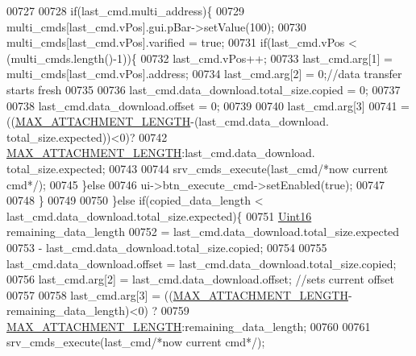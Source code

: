 \begin{DoxyCode}
{{{{{{{{{{{{{{{{{{{{00727                    
00728                    \textcolor{keywordflow}{if}(last\_cmd.multi\_address)\{
00729                         multi\_cmds[last\_cmd.vPos].gui.pBar->setValue(100);
00730                         multi\_cmds[last\_cmd.vPos].varified = \textcolor{keyword}{true};
00731                     \textcolor{keywordflow}{if}(last\_cmd.vPos < (multi\_cmds.length()-1))\{
00732                        last\_cmd.vPos++;
00733                        last\_cmd.arg[1] = multi\_cmds[last\_cmd.vPos].address;
00734                        last\_cmd.arg[2] = 0;\textcolor{comment}{//data transfer starts fresh}
00735                        
00736                        last\_cmd.data\_download.total\_size.copied     = 0;
00737                        
00738                        last\_cmd.data\_download.offset                = 0;
00739                        
00740                        last\_cmd.arg[3]              
00741                                = ((\hyperlink{a00031_aa8abe3a822c64813f7aaba3ca7e3db9c}{MAX\_ATTACHMENT\_LENGTH}-(last\_cmd.data\_download.
      total\_size.expected))<0)?
00742                                    \hyperlink{a00031_aa8abe3a822c64813f7aaba3ca7e3db9c}{MAX\_ATTACHMENT\_LENGTH}:last\_cmd.data\_download.
      total\_size.expected;
00743 
00744                        srv\_cmds\_execute(last\_cmd\textcolor{comment}{/*now current cmd*/});
00745                    \}\textcolor{keywordflow}{else}
00746                        ui->btn\_execute\_cmd->setEnabled(\textcolor{keyword}{true});
00747 
00748                    \}
00749 
00750                \}\textcolor{keywordflow}{else} \textcolor{keywordflow}{if}(copied\_data\_length < last\_cmd.data\_download.total\_size.expected)\{
00751                    \hyperlink{a00001_aae7407b021d43f7193a81a58cfb3e297}{Uint16} remaining\_data\_length 
00752                            = last\_cmd.data\_download.total\_size.expected 
00753                            - last\_cmd.data\_download.total\_size.copied;
00754 
00755                    last\_cmd.data\_download.offset = last\_cmd.data\_download.total\_size.copied;
00756                    last\_cmd.arg[2] = last\_cmd.data\_download.offset;  \textcolor{comment}{//sets current offset}
00757 
00758                    last\_cmd.arg[3] = ((\hyperlink{a00031_aa8abe3a822c64813f7aaba3ca7e3db9c}{MAX\_ATTACHMENT\_LENGTH}-remaining\_data\_length)<0)
      ?
00759                                           \hyperlink{a00031_aa8abe3a822c64813f7aaba3ca7e3db9c}{MAX\_ATTACHMENT\_LENGTH}:remaining\_data\_length;
00760 
00761                    srv\_cmds\_execute(last\_cmd\textcolor{comment}{/*now current cmd*/});
}}}}}}}}}}}}}}}}}}}}
\end{DoxyCode}
